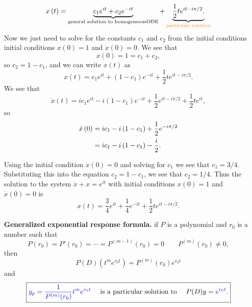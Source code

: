 \begin{equation*}
  \displaystyle  x\left(t\right)
  =\underbrace{c_{1}e^{it}+c_{2}e^{-it}}_{\text {general solution to homogeneousODE}}
  +\underbrace{\frac{1}{2}te^{it-i\pi /2}.}_{{\color{orange}{\text {particular solution}}} }
\end{equation*}
Now we just need to solve for the constants $c_1$ and $c_2$
from the initial conditions initial conditions $x(0)=1$ and $\dot{x}(0) = 0$.
We see that
\begin{equation*}
  \displaystyle  x\left(0\right)=1=c_{1}+c_{2},
\end{equation*}
so $c _2 = 1 - c _1$, and we can write $x(t)$ as
\begin{equation*}
  \displaystyle  x\left(t\right)
  =c_{1}e^{it}+\left(1-c_{1}\right)e^{-it}+\frac{1}{2}te^{it-i\pi /2}.
\end{equation*}
We see that
\begin{equation*}
  \displaystyle  \dot{x}\left(t\right)
  =ic_{1}e^{it}-i\left(1-c_{1}\right)e^{-it}+\frac{1}{2}e^{it-i\pi /2}+\frac{1}{2}te^{it},
\end{equation*}
so
\begin{align*}
  \displaystyle  \dot{x}\left(0\right)
  \displaystyle &=ic_{1}-i\left(1-c_{1}\right)+\frac{1}{2}e^{-i\pi /2}\\
  \displaystyle &=ic_{1}-i\left(1-c_{1}\right)-\frac{i}{2}.
\end{align*}

Using the initial condition $\dot{x}(0) = 0$ and solving for $c_1$ we see that $c_1 = 3/4$.
Substituting this into the equation $c_2 = 1 - c_1$, we see that $c_2 = 1/4$.
Thus the solution to the system $\ddot{x} + x = e^{it}$ with initial conditions $x(0)=1$ and $\dot{x}(0) = 0$
is
\begin{equation*}
  \displaystyle  x\left(t\right)=
  \frac{3}{4}e^{it}+\frac{1}{4}e^{-it}+\frac{1}{2}te^{it-i\pi /2}.
\end{equation*}


\textbf{Generalized exponential response formula.} if $P$ is a polynomial and $r_0$ is a number
such that
\begin{equation*}
  P(r_0) = P'(r_0) = \dotsb = P^{(m-1)}(r_0) = 0 \qquad P^{(m)}(r_0) \neq 0,
\end{equation*}
then
\begin{equation*}
  P(D)\left( t^ me^{r_0t} \right) = P^{(m)}(r_0)e^{r_0t}
\end{equation*}
and
\begin{equation*}
  \boxed {{\color{blue}{y_ p=\frac{1}{P^{(m)}(r_0)} t^ m e^{r_0t}}}
    \quad \text { is a particular solution to }
    \quad P(D) y = {\color{blue}{e^{r_0t}}} .}
\end{equation*}

